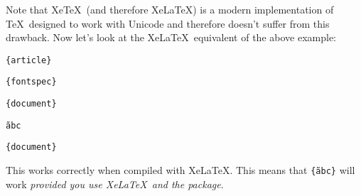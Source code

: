 \documentclass{nlctdoc}
\providecommand{\XeLaTeX}{XeLaTeX}
\providecommand{\XeTeX}{XeTeX}
\begin{document}
Note that \XeTeX\ (and therefore \XeLaTeX) is a modern
implementation of \TeX\ designed to work with Unicode and therefore
doesn't suffer from this drawback. Now let's look at the \XeLaTeX\
equivalent of the above example:
\begin{alltt}
\{article\}

\{fontspec\}

\{document\}

 \~abc

\{document\}
\end{alltt}

This works correctly when compiled with \XeLaTeX. This means
that \verb|{|\texttt{\~abc}\verb|}| will work
\emph{provided you use \XeLaTeX\ and the  package}.
\end{document}
